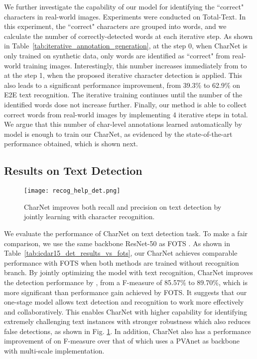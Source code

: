\documentclass[10pt,twocolumn,letterpaper]{article}
\begin{document}
We further investigate the capability of our model for identifying the ``correct" characters in real-world images. Experiments were conducted on Total-Text. In this experiment, the ``correct" characters are grouped into words, and we calculate the number of correctly-detected words at each iterative step. As shown in Table~\ref{tab:iterative_annotation_generation}, at the step 0, when CharNet is only trained on synthetic data, only  words are identified as ``correct" from real-world training images.
Interestingly, this number increases immediately from  to  at the step 1, when the proposed iterative character detection is applied. This also leads to a significant performance improvement, from 39.3\% to 62.9\% on E2E text recognition. The iterative training continues
until the number of the identified words dose not increase further. Finally, our method is able to collect  correct words from real-world images by implementing 4 iterative steps in total. We argue that this number of char-level annotations learned automatically by model is enough to train our CharNet, as evidenced by the state-of-the-art performance obtained, which is shown next.







\subsection{Results on Text Detection}
\begin{figure}[!t]
    \begin{center}
        \texttt{[image: recog\_help\_det.png]}
    \end{center}
    \vspace{-4mm}
    \caption{CharNet improves both recall and precision on text detection by jointly learning with  character recognition.}
    \label{fig:recog_help_det}
\end{figure}


We evaluate the performance of CharNet on text detection task.
To make a fair comparison, we use the same backbone ResNet-50 as FOTS \cite{liu2018fots}. As shown in Table~\ref{tab:icdar15_det_results_vs_fots}, our CharNet achieves comparable performance with FOTS when both methods are trained without recognition branch. By jointly optimizing the model with text recognition, CharNet improves the detection performance by , from a F-measure of 85.57\% to 89.70\%, which is more significant than  performance gain achieved by FOTS. It suggests that our one-stage model allows text detection and recognition to work more effectively and collaboratively. This enables CharNet with higher capability for identifying extremely challenging text instances with stronger robustness which also reduces false detections, as shown in Fig. \ref{fig:recog_help_det}. In addition, CharNet also has a performance improvement of   on F-measure over that of \cite{he2018end} which uses a PVAnet \cite{hong2016} as backbone with multi-scale implementation.
\end{document}
